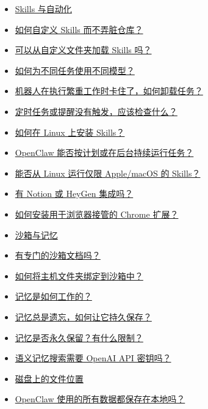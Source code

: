 \begin{itemize}
  \item \href{\#skills-and-automation}{Skills 与自动化}
  \item \href{\#how-do-i-customize-skills-without-keeping-the-repo-dirty}{如何自定义 Skills 而不弄脏仓库？}
  \item \href{\#can-i-load-skills-from-a-custom-folder}{可以从自定义文件夹加载 Skills 吗？}
  \item \href{\#how-can-i-use-different-models-for-different-tasks}{如何为不同任务使用不同模型？}
  \item \href{\#the-bot-freezes-while-doing-heavy-work-how-do-i-offload-that}{机器人在执行繁重工作时卡住了，如何卸载任务？}
  \item \href{\#cron-or-reminders-do-not-fire-what-should-i-check}{定时任务或提醒没有触发，应该检查什么？}
  \item \href{\#how-do-i-install-skills-on-linux}{如何在 Linux 上安装 Skills？}
  \item \href{\#can-openclaw-run-tasks-on-a-schedule-or-continuously-in-the-background}{OpenClaw 能否按计划或在后台持续运行任务？}
  \item \href{\#can-i-run-applemacosonly-skills-from-linux}{能否从 Linux 运行仅限 Apple/macOS 的 Skills？}
  \item \href{\#do-you-have-a-notion-or-heygen-integration}{有 Notion 或 HeyGen 集成吗？}
  \item \href{\#how-do-i-install-the-chrome-extension-for-browser-takeover}{如何安装用于浏览器接管的 Chrome 扩展？}
  \item \href{\#sandboxing-and-memory}{沙箱与记忆}
  \item \href{\#is-there-a-dedicated-sandboxing-doc}{有专门的沙箱文档吗？}
  \item \href{\#how-do-i-bind-a-host-folder-into-the-sandbox}{如何将主机文件夹绑定到沙箱中？}
  \item \href{\#how-does-memory-work}{记忆是如何工作的？}
  \item \href{\#memory-keeps-forgetting-things-how-do-i-make-it-stick}{记忆总是遗忘，如何让它持久保存？}
  \item \href{\#does-memory-persist-forever-what-are-the-limits}{记忆是否永久保留？有什么限制？}
  \item \href{\#does-semantic-memory-search-require-an-openai-api-key}{语义记忆搜索需要 OpenAI API 密钥吗？}
  \item \href{\#where-things-live-on-disk}{磁盘上的文件位置}
  \item \href{\#is-all-data-used-with-openclaw-saved-locally}{OpenClaw 使用的所有数据都保存在本地吗？}

\end{itemize}
